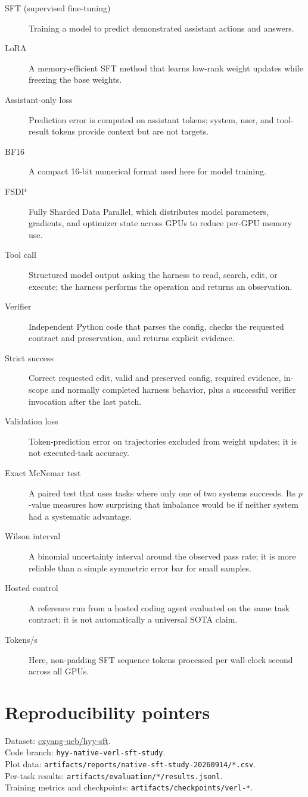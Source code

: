\documentclass[11pt]{article}
\newcommand{\code}[1]{\texttt{#1}}
\begin{document}
\begin{description}
\item[SFT (supervised fine-tuning)] Training a model to predict demonstrated assistant actions and answers.
\item[LoRA] A memory-efficient SFT method that learns low-rank weight updates while freezing the base weights.
\item[Assistant-only loss] Prediction error is computed on assistant tokens; system, user, and tool-result tokens provide context but are not targets.
\item[BF16] A compact 16-bit numerical format used here for model training.
\item[FSDP] Fully Sharded Data Parallel, which distributes model parameters,
gradients, and optimizer state across GPUs to reduce per-GPU memory use.
\item[Tool call] Structured model output asking the harness to read, search, edit, or execute; the harness performs the operation and returns an observation.
\item[Verifier] Independent Python code that parses the config, checks the requested contract and preservation, and returns explicit evidence.
\item[Strict success] Correct requested edit, valid and preserved config,
required evidence, in-scope and normally completed harness behavior, plus a
successful verifier invocation after the last patch.
\item[Validation loss] Token-prediction error on trajectories excluded from weight updates; it is not executed-task accuracy.
\item[Exact McNemar test] A paired test that uses tasks where only one of two
systems succeeds.  Its $p$-value measures how surprising that imbalance would
be if neither system had a systematic advantage.
\item[Wilson interval] A binomial uncertainty interval around the observed pass
rate; it is more reliable than a simple symmetric error bar for small samples.
\item[Hosted control] A reference run from a hosted coding agent evaluated on the same task contract; it is not automatically a universal SOTA claim.
\item[Tokens/s] Here, non-padding SFT sequence tokens processed per wall-clock second across all GPUs.
\end{description}

\section*{Reproducibility pointers}

Dataset: \href{https://huggingface.co/datasets/cxyang-ucb/hyy-sft}{cxyang-ucb/hyy-sft}.\\
Code branch: \code{hyy-native-verl-sft-study}.\\
Plot data: \code{artifacts/reports/native-sft-study-20260914/*.csv}.\\
Per-task results: \code{artifacts/evaluation/*/results.jsonl}.\\
Training metrics and checkpoints: \code{artifacts/checkpoints/verl-*}.
\end{document}
